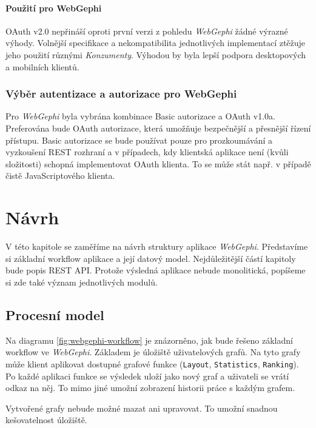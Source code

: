 \documentclass[thesis=M,czech]{FITthesis}[2014/05/6]
\begin{document}
\subsubsection{Použití pro WebGephi}
OAuth v2.0 nepřináší oproti první verzi z pohledu \textit{WebGephi} žádné výrazné výhody. Volnější specifikace a nekompatibilita jednotlivých implementací ztěžuje 
jeho použití různými \textit{Konzumenty}. Výhodou by byla lepší podpora desktopových a mobilních klientů.

\subsection{Výběr autentizace a autorizace pro WebGephi}
Pro \textit{WebGephi} byla vybrána kombinace Basic autorizace a OAuth v1.0a. Preferována bude OAuth autorizace, která umožňuje bezpečnější a přesnější řízení přístupu.
Basic autorizace se bude používat pouze pro prozkoumávání a vyzkoušení REST rozhraní a v případech, kdy klientská aplikace není (kvůli složitosti) schopná implementovat OAuth klienta.
To se může stát např. v případě čistě JavaScriptového klienta.

\chapter{Návrh}
V této kapitole se zaměříme na návrh struktury aplikace \textit{WebGephi}. Představíme si základní workflow aplikace a její datový model.
Nejdůležitější částí kapitoly bude popis REST API. Protože výsledná aplikace nebude monolitická, popíšeme si zde také význam jednotlivých 
modulů.

\section{Procesní model}

Na diagramu \ref{fig:webgephi-workflow} je znázorněno, jak bude řešeno základní workflow ve \textit{WebGephi}. Základem je úložiště uživatelových 
grafů. Na tyto grafy může klient aplikovat dostupné grafové funkce (\texttt{Layout}, \texttt{Statistics}, \texttt{Ranking}). Po každé aplikaci funkce
se výsledek uloží jako nový graf a uživateli se vrátí odkaz na něj. To mimo jiné umožní zobrazení historii práce s každým grafem.

Vytvořené grafy nebude možné mazat ani upravovat. To umožní snadnou kešovatelnost úložiště. 
\end{document}
